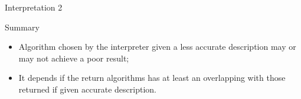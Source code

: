 \documentclass[10pt]{beamer}
\newcommand{\tabitem}{~~\llap{\textbullet}~~}
\newcommand{\tc}[1]{\textcolor{red}{#1}}
\begin{document}


\begin{frame}{Interpretation 2}

\begin{exampleblock}{Summary}
\begin{itemize}
\item Algorithm chosen by the interpreter given a less accurate description may or may not achieve a poor result; \\
\item It depends if the return algorithms has at least an overlapping with those returned if given accurate description.
\end{itemize}
\end{exampleblock}

\end{frame}
\end{document}
